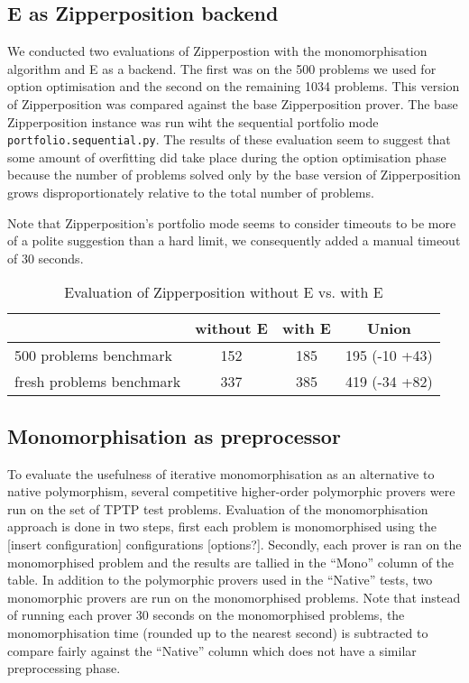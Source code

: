 \documentclass[]{ceurart}
\begin{document}
\subsection{E as Zipperposition backend}

We conducted two evaluations of Zipperpostion with the monomorphisation algorithm and E as a backend. The first was on the 500 problems we used for option optimisation and the second on the remaining 1034 problems. This version of Zipperposition was compared against the base Zipperposition prover. The base Zipperposition instance was run wiht the sequential portfolio mode \verb|portfolio.sequential.py|. The results of these evaluation seem to suggest that some amount of overfitting did take place during the option optimisation phase because the number of problems solved only by the base version of Zipperposition grows disproportionately relative to the total number of problems.

Note that Zipperposition's portfolio mode seems to consider timeouts to be more of a polite suggestion than a hard limit, we consequently added a manual timeout of 30 seconds.

\begin{table}[ht]
\caption{Evaluation of Zipperposition without E vs. with E}
\centering\begin{tabular}{@{}lccc@{}}
   \toprule
   & without E & with E & Union \\
   \midrule
   500 problems benchmark   & 152 & 185 & 195 (-10 +43) \\
   fresh problems benchmark & 337 & 385 & 419 (-34 +82)\\
   \bottomrule
\end{tabular}
\end{table}


\subsection{Monomorphisation as preprocessor}

To evaluate the usefulness of iterative monomorphisation as an alternative to native polymorphism, several competitive higher-order polymorphic provers were run on the set of TPTP test problems. Evaluation of the monomorphisation approach is done in two steps, first each problem is monomorphised using the [insert configuration] configurations [options?]. Secondly, each prover is ran on the monomorphised problem and the results are tallied in the ``Mono'' column of the table. In addition to the polymorphic provers used in the ``Native'' tests, two monomorphic provers are run on the monomorphised problems. Note that instead of running each prover 30 seconds on the monomorphised problems, the monomorphisation time (rounded up to the nearest second) is subtracted to compare fairly against the ``Native'' column which does not have a similar preprocessing phase.
\end{document}
